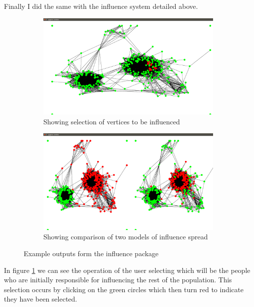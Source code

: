\documentclass[12pt,a4paper]{article}
\begin{document}
Finally I did the same with the influence system detailed above.

\begin{figure}[htb]
\centering
\captionsetup[subfigure]{justification=centering}
	\begin{subfigure}[b]{0.4\linewidth}
	\caption{Showing selection of vertices to be influenced}
	\label{fig:influenceSelect}
	\includegraphics[scale=0.1]{Influence1.png}
	\end{subfigure}
\quad
	\begin{subfigure}[b]{0.4\linewidth}
	\caption{Showing comparison of two models of influence spread}
	\label{fig:influenceCompare}
	\includegraphics[scale=0.1]{Influence3.png}
	\end{subfigure}
\caption{Example outputs form the influence package}
\label{fig:influence}
\end{figure}

In figure \ref{fig:influenceSelect} we can see the operation of the user selecting which will be the people who are initially responsible for influencing the rest of the population. This selection occurs by clicking on the green circles which then turn red to indicate they have been selected.
\end{document}
